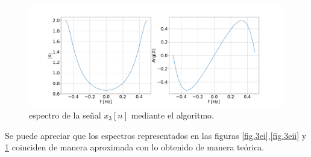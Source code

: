 \documentclass[11pt,a4paper]{article}
\begin{document}
    \begin{figure}[H]
    \centering
    \includegraphics[width=\textwidth]{Img/punto_3_e_3.png}
    \caption{espectro de la señal $x_{3}[n]$ mediante el algoritmo.}
    \label{fig.3eiii}
    \end{figure}

    Se puede apreciar que los espectros representados en las figuras \ref{fig.3ei},\ref{fig.3eii} y \ref{fig.3eiii} coinciden de manera aproximada con lo obtenido de manera teórica. 
    
    
\end{document}
